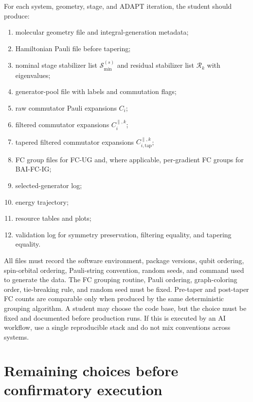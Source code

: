 \documentclass[11pt]{article}
\begin{document}
For each system, geometry, stage, and ADAPT iteration, the student should produce:
\begin{enumerate}[label=(\roman*),leftmargin=2.4em]
    \item molecular geometry file and integral-generation metadata;
    \item Hamiltonian Pauli file before tapering;
    \item nominal stage stabilizer list $\mathcal S_{\min}^{(s)}$ and residual stabilizer list $\mathcal R_k$ with eigenvalues;
    \item generator-pool file with labels and commutation flags;
    \item raw commutator Pauli expansions $C_i$;
    \item filtered commutator expansions $C_i^{\parallel,k}$;
    \item tapered filtered commutator expansions $C_{i,\mathrm{tap}}^{\parallel,k}$;
    \item FC group files for FC-UG and, where applicable, per-gradient FC groups for BAI-FC-IG;
    \item selected-generator log;
    \item energy trajectory;
    \item resource tables and plots;
    \item validation log for symmetry preservation, filtering equality, and tapering equality.
\end{enumerate}
All files must record the software environment, package versions, qubit ordering, spin-orbital ordering, Pauli-string convention, random seeds, and command used to generate the data. The FC grouping routine, Pauli ordering, graph-coloring order, tie-breaking rule, and random seed must be fixed. Pre-taper and post-taper FC counts are comparable only when produced by the same deterministic grouping algorithm. A student may choose the code base, but the choice must be fixed and documented before production runs. If this is executed by an AI workflow, use a single reproducible stack and do not mix conventions across systems.

\section{Remaining choices before confirmatory execution}
\label{sec:remaining}
\end{document}
